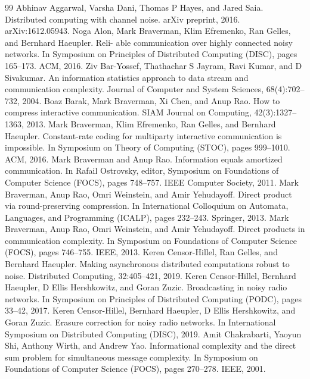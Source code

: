 \documentclass[10pt,a4paper]{article}
\begin{document}
\begin{thebibliography}{99}
 Abhinav Aggarwal, Varsha Dani, Thomas P Hayes, and Jared Saia. Distributed computing with channel noise. arXiv preprint, 2016. arXiv:1612.05943.
 Noga Alon, Mark Braverman, Klim Efremenko, Ran Gelles, and Bernhard Haeupler. Reli- able communication over highly connected noisy networks. In Symposium on Principles of Distributed Computing (DISC), pages 165–173. ACM, 2016.
 Ziv Bar-Yossef, Thathachar S Jayram, Ravi Kumar, and D Sivakumar. An information statistics approach to data stream and communication complexity. Journal of Computer and System Sciences, 68(4):702–732, 2004.
 Boaz Barak, Mark Braverman, Xi Chen, and Anup Rao. How to compress interactive communication. SIAM Journal on Computing, 42(3):1327–1363, 2013.
 Mark Braverman, Klim Efremenko, Ran Gelles, and Bernhard Haeupler. Constant-rate coding for multiparty interactive communication is impossible. In Symposium on Theory of Computing (STOC), pages 999–1010. ACM, 2016.
 Mark Braverman and Anup Rao. Information equals amortized communication. In Rafail Ostrovsky, editor, Symposium on Foundations of Computer Science (FOCS), pages 748–757. IEEE Computer Society, 2011.
 Mark Braverman, Anup Rao, Omri Weinstein, and Amir Yehudayoff. Direct product via round-preserving compression. In International Colloquium on Automata, Languages, and Programming (ICALP), pages 232–243. Springer, 2013.
 Mark Braverman, Anup Rao, Omri Weinstein, and Amir Yehudayoff. Direct products in communication complexity. In Symposium on Foundations of Computer Science (FOCS), pages 746–755. IEEE, 2013.
 Keren Censor-Hillel, Ran Gelles, and Bernhard Haeupler. Making asynchronous distributed computations robust to noise. Distributed Computing, 32:405–421, 2019.
 Keren Censor-Hillel, Bernhard Haeupler, D Ellis Hershkowitz, and Goran Zuzic. Broadcasting in noisy radio networks. In Symposium on Principles of Distributed Computing (PODC), pages 33–42, 2017.
 Keren Censor-Hillel, Bernhard Haeupler, D Ellis Hershkowitz, and Goran Zuzic. Erasure correction for noisy radio networks. In International Symposium on Distributed Computing (DISC), 2019.
 Amit Chakrabarti, Yaoyun Shi, Anthony Wirth, and Andrew Yao. Informational complexity and the direct sum problem for simultaneous message complexity. In Symposium on Foundations of Computer Science (FOCS), pages 270–278. IEEE, 2001.

\end{thebibliography}
\end{document}
